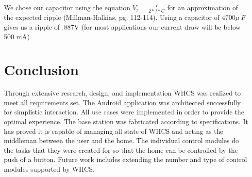 \documentclass[draft,twocolumn,letterpaper,10pt]{IEEEtran}
\begin{document}
We chose our capacitor using the equation $V_r = \frac{I}{2*f*C}$ for an approximation
of the expected ripple (Millman-Halkias, pg. 112-114). Using a capacitor of
$4700\mu~F$ gives us a ripple of .887V (for most applications our current draw will
be below 500 mA).

\section{Conclusion}
Through extensive research, design, and implementation WHCS was realized to
meet all requirements set. The Android application was architected successfully
for simplistic interaction. All use cases were implemented in order to provide
the optimal experience. The base station was fabricated according to
specifications. It has proved it is capable of managing all state of WHCS and
acting as the middleman between the user and the home. The individual control
modules do the tasks that they were created for so that the home can be
controlled by the push of a button. Future work includes extending the
number and type of control modules supported by WHCS.

%
%
%

\vspace{4cm}
\end{document}
